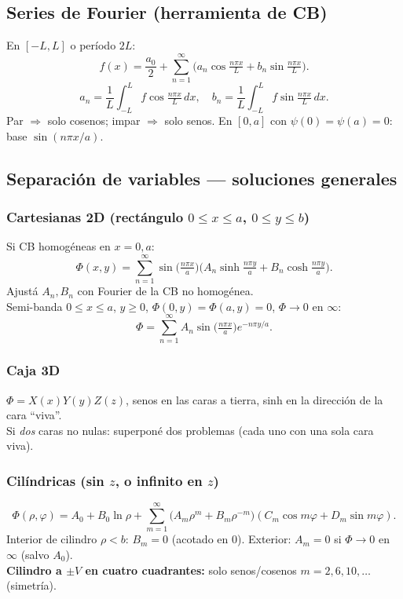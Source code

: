 \documentclass[10pt,a4paper]{article}
\begin{document}
\subsection{Series de Fourier (herramienta de CB)}
En $[ -L,L]$ o período $2L$:
\[
f(x)=\frac{a_0}{2}+\sum_{n=1}^\infty\!\big(a_n\cos\tfrac{n\pi x}{L}+b_n\sin\tfrac{n\pi x}{L}\big).
\]
\[
a_n=\frac1L\int_{-L}^L f\cos\tfrac{n\pi x}{L}\,dx,\quad
b_n=\frac1L\int_{-L}^L f\sin\tfrac{n\pi x}{L}\,dx.
\]
Par $\Rightarrow$ solo cosenos; impar $\Rightarrow$ solo senos. En $[0,a]$ con $\psi(0)=\psi(a)=0$: base $\sin(n\pi x/a)$.

\subsection{Separación de variables --- soluciones generales}

\subsubsection{Cartesianas 2D (rectángulo $0\le x\le a$, $0\le y\le b$)}
Si CB homogéneas en $x=0,a$:
\[
\Phi(x,y)=\sum_{n=1}^\infty\sin\!\big(\tfrac{n\pi x}{a}\big)
\big(A_n\sinh\tfrac{n\pi y}{a}+B_n\cosh\tfrac{n\pi y}{a}\big).
\]
Ajustá $A_n,B_n$ con Fourier de la CB no homogénea.\\
Semi-banda $0\le x\le a$, $y\ge 0$, $\Phi(0,y)=\Phi(a,y)=0$, $\Phi\to 0$ en $\infty$:
\[
\Phi=\sum_{n=1}^\infty A_n\sin\!\big(\tfrac{n\pi x}{a}\big)e^{-n\pi y/a}.
\]

\subsubsection{Caja 3D}
$\Phi=X(x)Y(y)Z(z)$, senos en las caras a tierra, sinh en la dirección de la cara ``viva''.\\
Si \emph{dos} caras no nulas: superponé dos problemas (cada uno con una sola cara viva).

\subsubsection{Cilíndricas (sin $z$, o infinito en $z$)}
\[
\Phi(\rho,\varphi)=A_0+B_0\ln\rho+\sum_{m=1}^\infty\!\big(A_m\rho^m+B_m\rho^{-m}\big)
(C_m\cos m\varphi+D_m\sin m\varphi).
\]
Interior de cilindro $\rho<b$: $B_m=0$ (acotado en $0$). Exterior: $A_m=0$ si $\Phi\to 0$ en $\infty$ (salvo $A_0$).\\
\textbf{Cilindro a $\pm V$ en cuatro cuadrantes:} solo senos/cosenos $m=2,6,10,\ldots$ (simetría).
\end{document}
